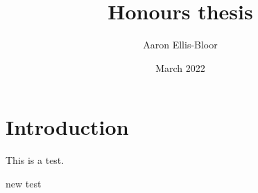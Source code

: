 \documentclass{article}
\title{Honours thesis}
\author{Aaron Ellis-Bloor}
\date{March 2022}
\begin{document}
\maketitle

\section{Introduction}

This is a test.

new test
\end{document}
